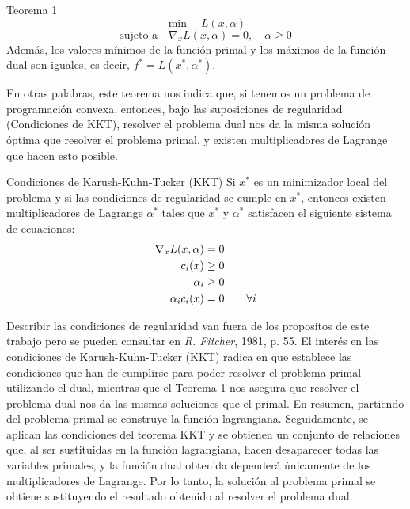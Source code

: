 \documentclass[letterpaper,12pt,oneside]{book}
\begin{document}
{{\begin{namedtheorem}{Teorema 1}
           $$ \min \quad L(x, \alpha)$$
           $$\text{sujeto a} \quad \nabla_x L(x, \alpha) = 0, \quad \alpha \geq 0$$
            Además, los valores mínimos de la función primal y los máximos de la función dual son iguales, es decir, \( f^* = L(x^*, \alpha^*) \).
    \end{namedtheorem}
	
En otras palabras, este teorema nos indica que, si tenemos un problema de programación convexa, entonces, bajo las suposiciones de regularidad (Condiciones de KKT), resolver el problema dual nos da la misma solución óptima que resolver el problema primal, y existen multiplicadores de Lagrange que hacen esto posible.



     \begin{namedtheorem}{Condiciones de Karush-Kuhn-Tucker (KKT)}
    Si \( x^* \) es un minimizador local del problema  y si las condiciones de regularidad  se cumple en \( x^* \),
entonces existen multiplicadores de Lagrange \( \alpha^* \) tales que \( x^* \) y \( \alpha^* \) satisfacen el siguiente sistema de ecuaciones:    
	\begin{align}
		\nabla_x L(x, \alpha) &= 0 \notag\\   
		c_i(x)& \geq 0 \notag\\ 
		\alpha_i & \geq 0 \notag\\ 
		\alpha_i c_i(x) &= 0 \qquad \forall i
	\end{align}
\end{namedtheorem}

    
    Describir las condiciones de regularidad van fuera de los propositos de este trabajo pero se pueden consultar en \textit{R. Fitcher}, 1981, p. 55. El interés en las condiciones de Karush-Kuhn-Tucker (KKT) radica en que establece las condiciones que han de cumplirse para poder resolver el problema primal utilizando el dual, mientras que el Teorema 1 nos asegura que resolver el problema dual nos da las mismas soluciones que el primal. En resumen, partiendo del problema primal se construye la función lagrangiana. Seguidamente, se aplican las condiciones del teorema KKT y se obtienen un conjunto de relaciones que, al ser sustituidas en la función lagrangiana, hacen desaparecer todas las variables primales, y la función dual obtenida dependerá únicamente de los multiplicadores de Lagrange. Por lo tanto, la solución al problema primal se obtiene sustituyendo el resultado obtenido al resolver el problema dual.
}













}
\end{document}
